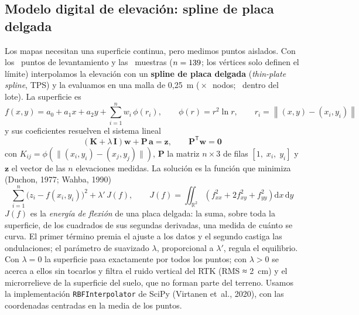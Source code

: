 \documentclass[10pt]{article}
\begin{document}
\subsection{Modelo digital de elevación: spline de placa delgada}\label{sec:met-mde}
Los mapas necesitan una superficie continua, pero medimos puntos aislados. Con los \NElev\ puntos de levantamiento y las
\NMuestras\ muestras (\(n = 139\); los vértices solo definen el límite) interpolamos la elevación con un
\textbf{spline de placa delgada} (\emph{thin-plate spline}, TPS) y la evaluamos en una malla de 0,25~m
(\MallaFilas\,×\,\MallaCols\ nodos; \MallaCeldas\ dentro del lote). La superficie es
\begin{equation}
  f(x,y) = a_0 + a_1x + a_2y + \sum_{i=1}^{n} w_i\,\phi\!\left(r_i\right), \qquad
  \phi(r) = r^2\ln r, \qquad r_i = \left\lVert (x,y) - (x_i,y_i)\right\rVert
  \label{eq:tps}
\end{equation}
y sus coeficientes resuelven el sistema lineal
\begin{equation}
  \left(\mathbf{K} + \lambda\,\mathbf{I}\right)\mathbf{w} + \mathbf{P}\,\mathbf{a} = \mathbf{z}, \qquad
  \mathbf{P}^{\mathsf{T}}\mathbf{w} = \mathbf{0}
  \label{eq:tpssis}
\end{equation}
con \(K_{ij} = \phi(\lVert (x_i,y_i)-(x_j,y_j)\rVert)\), \(\mathbf{P}\) la matriz \(n \times 3\) de filas
\([1,\;x_i,\;y_i]\) y \(\mathbf{z}\) el vector de las \(n\) elevaciones medidas. La solución es la función que minimiza
(Duchon, 1977; Wahba, 1990)
\begin{equation}
  \sum_{i=1}^{n}\bigl(z_i - f(x_i,y_i)\bigr)^2 + \lambda'\,J(f), \qquad
  J(f) = \iint_{\mathbb{R}^2}\left(f_{xx}^2 + 2f_{xy}^2 + f_{yy}^2\right)\mathrm{d}x\,\mathrm{d}y
  \label{eq:tpsfun}
\end{equation}
\(J(f)\) es la \emph{energía de flexión} de una placa delgada: la suma, sobre toda la superficie, de los cuadrados de sus segundas derivadas, una medida de cuánto se curva. El
primer término premia el ajuste a los datos y el segundo castiga las ondulaciones; el parámetro de suavizado
\(\lambda\), proporcional a \(\lambda'\), regula el equilibrio. Con \(\lambda = 0\) la superficie pasa exactamente por
todos los puntos; con \(\lambda > 0\) se acerca a ellos sin tocarlos y filtra el ruido vertical del RTK
(RMS ≈ 2~cm) y el microrrelieve de la superficie del suelo, que no forman parte del terreno. Usamos la implementación
\texttt{RBFInterpolator} de SciPy (Virtanen et~al., 2020), con las coordenadas centradas en la media de los puntos.
\end{document}
